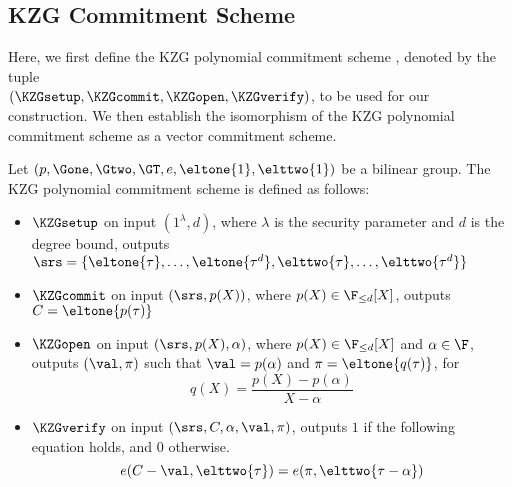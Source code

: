 

\subsection{KZG Commitment Scheme}
\label{sec:KZG}

Here, we first define the KZG polynomial commitment scheme \cite{KZG}, denoted by the tuple \\
$(\KZGsetup,\KZGcommit,\KZGopen, \KZGverify)$, to be used for our construction. We then establish the isomorphism of the KZG polynomial commitment scheme as a vector commitment scheme.

\begin{definition}
	Let $(p,\Gone,\Gtwo,\GT, e, \eltone{1},\elttwo{1})$ be a bilinear group. The KZG polynomial commitment scheme is defined as follows: 
	\begin{itemize}
		\item $\KZGsetup$ on input $(1^\lambda,d)$, where $\lambda$ is the security parameter and $d$ is the degree bound, outputs $\srs = \{ \eltone{\tau},\ldots,\eltone{\tau^d},\elttwo{\tau},\ldots,\elttwo{\tau^d}\}$
		\item $\KZGcommit$ on input $(\srs,p(X))$, where $p(X) \in \F_{\leq d}[X]$, outputs $C=\eltone{p(\tau)}$
		\item $\KZGopen$ on input $(\srs,p(X),\alpha)$, where $p(X) \in \F_{\leq d}[X]$ and $\alpha\in \F$, outputs $(\val, \pi)$ such that $\val=p(\alpha)$ and $\pi=\eltone{q(\tau)}$, for
		\[ q(X)=\frac{p(X)-p(\alpha)}{X-\alpha} \]
		\item $\KZGverify$ on input $(\srs,C,\alpha,\val,\pi)$, outputs $1$ if the following equation holds, and $0$ otherwise.
		\[ e(C-\val, \elttwo{\tau}) = e(\pi, \elttwo{\tau-\alpha}) \]
	\end{itemize}
\end{definition}


